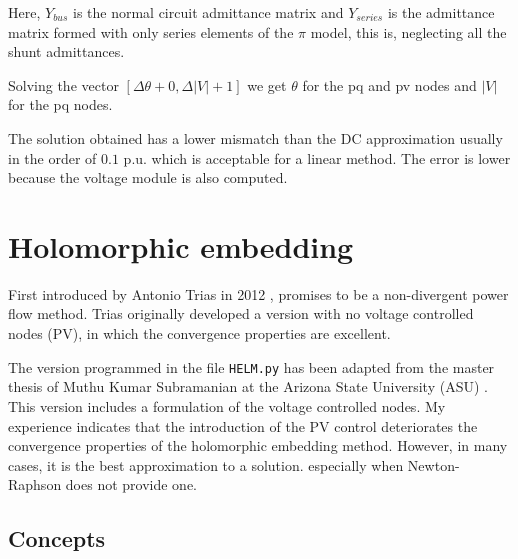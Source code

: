 \documentclass[a4paper,twoside,fleqn]{tufte-book}
\begin{document}
Here, $Y_{bus}$ is the normal circuit admittance matrix and $Y_{series}$ is the admittance matrix formed with only series elements of the $\pi$ model, this is, neglecting all the shunt admittances.

Solving the vector $[\Delta \theta + 0, \Delta |V| + 1]$ we get $\theta$ for the pq and pv nodes and $|V|$ for the pq nodes.\newline

%

The solution obtained has a lower mismatch than the DC approximation usually in the order of $0.1$ p.u. which is acceptable for a linear method. The error is lower because the voltage module is also computed.

\section{Holomorphic embedding}

First introduced by Antonio Trias in 2012 \cite{TriasHELM}, promises to be a non-divergent power flow method. Trias originally developed a version with no voltage controlled nodes (PV), in which the convergence properties are excellent. 

The version programmed in the file \verb|HELM.py| has been adapted from the master thesis of Muthu Kumar Subramanian at the Arizona State University (ASU) \cite{subramanian2014application}. This version includes a formulation of the voltage controlled nodes. My experience indicates that the introduction of the PV control deteriorates the convergence properties of the holomorphic embedding method. However, in many cases, it is the best approximation to a solution. especially when Newton-Raphson does not provide one.


\subsection{Concepts}
\end{document}
